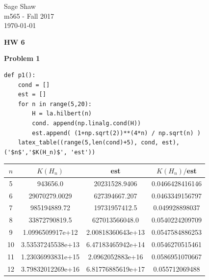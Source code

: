 \documentclass[12pt]{article}
\newcommand{\problem}[1]{\hspace{-4 ex} \large \textbf{Problem #1} }
\begin{document}
	\thispagestyle{empty}
	
	\begin{flushright}
		Sage Shaw \\
		m565 - Fall 2017 \\
		\today
	\end{flushright}
	
{\large \textbf{HW 6}}\bigbreak

\problem{1} \\

	\begin{lstlisting}
def p1():
	cond = []
	est = []
	for n in range(5,20):
		H = la.hilbert(n)
		cond. append(np.linalg.cond(H))
		est.append( (1+np.sqrt(2))**(4*n) / np.sqrt(n) )
	latex_table((range(5,len(cond)+5), cond, est), 
('$n$','$K(H_n)$', 'est'))
	\end{lstlisting}
	
	\begin{center}
		\begin{tabular}{|c|c|c|c|}
			\hline
			$n$&$K(H_n)$&est&$K(H_n)/$est\\ \hline
			5&943656.0&20231528.9406&0.0466428416146\\ \hline
			6&29070279.0029&627394667.207&0.0463349156797\\ \hline
			7&985194889.72&19731957412.5&0.049928898037\\ \hline
			8&33872790819.5&627013566048.0&0.0540224209709\\ \hline
			9&1.0996509917e+12&2.00818360643e+13&0.0547584886253\\ \hline
			10&3.53537245538e+13&6.47183465942e+14&0.0546270515461\\ \hline
			11&1.23036993831e+15&2.0962052883e+16&0.0586951070667\\ \hline
			12&3.79832012269e+16&6.81776885619e+17&0.055712069488\\ \hline
		\end{tabular}
	\end{center}
\end{document}
